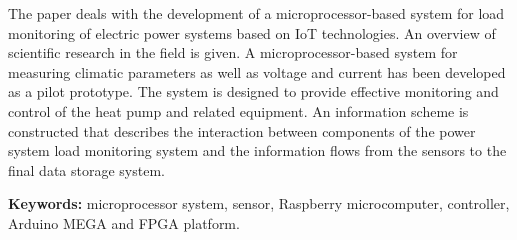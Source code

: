 The paper deals with the development of a microprocessor-based system
for load monitoring of electric power systems based on IoT technologies.
An overview of scientific research in the field is given. A
microprocessor-based system for measuring climatic parameters as well as
voltage and current has been developed as a pilot prototype. The system
is designed to provide effective monitoring and control of the heat pump
and related equipment. An information scheme is constructed that
describes the interaction between components of the power system load
monitoring system and the information flows from the sensors to the
final data storage system.

{\bfseries Keywords:} microprocessor system, sensor, Raspberry
microcomputer, controller, Arduino MEGA and FPGA platform.



